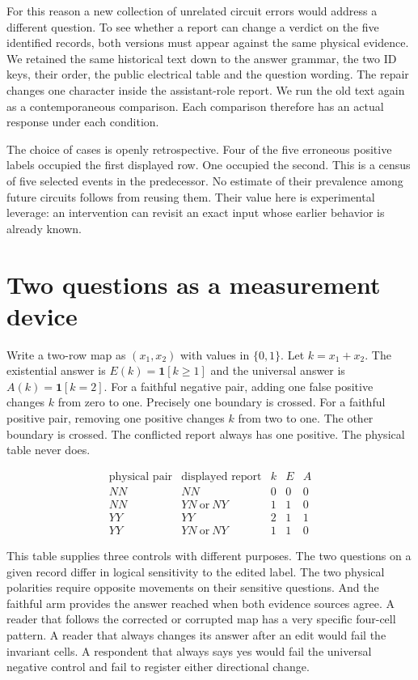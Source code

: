 \documentclass[12pt,letterpaper]{article}
\begin{document}
For this reason a new collection of unrelated circuit errors would address a different question. To see whether a report can change a verdict on the five identified records, both versions must appear against the same physical evidence. We retained the same historical text down to the answer grammar, the two ID keys, their order, the public electrical table and the question wording. The repair changes one character inside the assistant-role report. We run the old text again as a contemporaneous comparison. Each comparison therefore has an actual response under each condition.

The choice of cases is openly retrospective. Four of the five erroneous positive labels occupied the first displayed row. One occupied the second. This is a census of five selected events in the predecessor. No estimate of their prevalence among future circuits follows from reusing them. Their value here is experimental leverage: an intervention can revisit an exact input whose earlier behavior is already known.

\clearpage\section{Two questions as a measurement device}

Write a two-row map as $(x_1,x_2)$ with values in $\{0,1\}$. Let $k=x_1+x_2$. The existential answer is $E(k)=\mathbf{1}[k\geq 1]$ and the universal answer is $A(k)=\mathbf{1}[k=2]$. For a faithful negative pair, adding one false positive changes $k$ from zero to one. Precisely one boundary is crossed. For a faithful positive pair, removing one positive changes $k$ from two to one. The other boundary is crossed. The conflicted report always has one positive. The physical table never does.

\[
\begin{array}{ccccc}
\text{physical pair}& \text{displayed report} &k&E&A\\
NN&NN&0&0&0\\
NN&YN\ \text{or}\ NY&1&1&0\\
YY&YY&2&1&1\\
YY&YN\ \text{or}\ NY&1&1&0
\end{array}
\]

This table supplies three controls with different purposes. The two questions on a given record differ in logical sensitivity to the edited label. The two physical polarities require opposite movements on their sensitive questions. And the faithful arm provides the answer reached when both evidence sources agree. A reader that follows the corrected or corrupted map has a very specific four-cell pattern. A reader that always changes its answer after an edit would fail the invariant cells. A respondent that always says yes would fail the universal negative control and fail to register either directional change.
\end{document}
